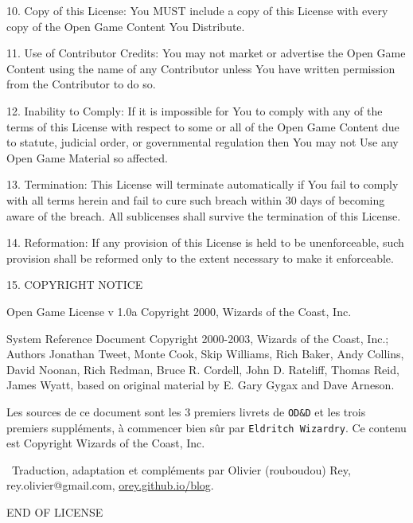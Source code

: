 \documentclass[11pt]{article}
\begin{document}
\bigskip

10. Copy of this License: You MUST include a copy of this License with every copy of the Open Game Content You Distribute.

\bigskip

11. Use of Contributor Credits: You may not market or advertise the Open Game Content using the name of any Contributor unless You have written permission from the Contributor to do so.

\bigskip

12. Inability to Comply: If it is impossible for You to comply with any of the terms of this License with respect to some or all of the Open Game Content due to statute, judicial order, or governmental regulation then You may not Use any Open Game Material so affected.

\bigskip

13. Termination: This License will terminate automatically if You fail to comply with all terms herein and fail to cure such breach within 30 days of becoming aware of the breach. All sublicenses shall survive the termination of this License.

\bigskip

14. Reformation: If any provision of this License is held to be unenforceable, such provision shall be reformed only to the extent necessary to make it enforceable.

\bigskip

15. COPYRIGHT NOTICE

\bigskip

Open Game License v 1.0a Copyright 2000, Wizards of the Coast, Inc.

\bigskip

System Reference Document Copyright 2000-2003, Wizards of the Coast, Inc.; Authors Jonathan Tweet, Monte Cook, Skip Williams, Rich Baker, Andy Collins, David Noonan, Rich Redman, Bruce R. Cordell, John D. Rateliff, Thomas Reid, James Wyatt, based on original material by E. Gary Gygax and Dave Arneson.

\bigskip

Les sources de ce document sont les 3 premiers livrets de \texttt{OD\&D} et les trois premiers suppléments, à commencer bien sûr par \texttt{Eldritch Wizardry}. Ce contenu est Copyright Wizards of the Coast, Inc.

\bigskip

\textcopyright\ Traduction, adaptation et compléments par Olivier (rouboudou) Rey, rey.olivier@gmail.com, \linebreak \href{https://orey.github.io/blog}{orey.github.io/blog}.

\bigskip

END OF LICENSE
\end{document}
